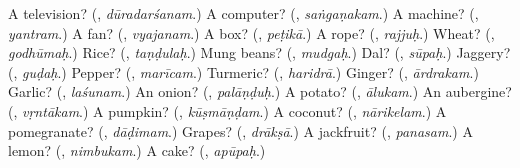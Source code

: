 \begin{tcolorbox}[breakable,colback=teal!4,colframe=teal!35!black,title={Before you move on}]
A television? (\textbf{}, \emph{dūradarśanam}.) A computer? (\textbf{}, \emph{saṅgaṇakam}.) A machine? (\textbf{}, \emph{yantram}.) A fan? (\textbf{}, \emph{vyajanam}.) A box? (\textbf{}, \emph{peṭikā}.) A rope? (\textbf{}, \emph{rajjuḥ}.) Wheat? (\textbf{}, \emph{godhūmaḥ}.) Rice? (\textbf{}, \emph{taṇḍulaḥ}.) Mung beans? (\textbf{}, \emph{mudgaḥ}.) Dal? (\textbf{}, \emph{sūpaḥ}.) Jaggery? (\textbf{}, \emph{guḍaḥ}.) Pepper? (\textbf{}, \emph{marīcam}.) Turmeric? (\textbf{}, \emph{haridrā}.) Ginger? (\textbf{}, \emph{ārdrakam}.) Garlic? (\textbf{}, \emph{laśunam}.) An onion? (\textbf{}, \emph{palāṇḍuḥ}.) A potato? (\textbf{}, \emph{ālukam}.) An aubergine? (\textbf{}, \emph{vṛntākam}.) A pumpkin? (\textbf{}, \emph{kūṣmāṇḍam}.) A coconut? (\textbf{}, \emph{nārikelam}.) A pomegranate? (\textbf{}, \emph{dāḍimam}.) Grapes? (\textbf{}, \emph{drākṣā}.) A jackfruit? (\textbf{}, \emph{panasam}.) A lemon? (\textbf{}, \emph{nimbukam}.) A cake? (\textbf{}, \emph{apūpaḥ}.)
\end{tcolorbox}
